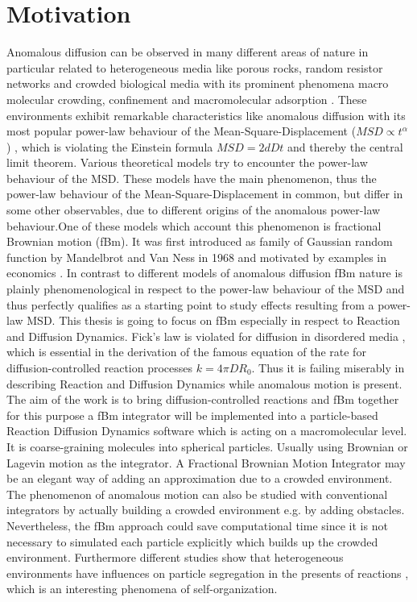 \documentclass[
  a4paper,BCOR10mm,oneside,
  bibtotoc,idxtotoc,
  headsepline,footsepline,%
  fleqn,openbib
]{scrbook}
\begin{document}
\chapter{Motivation}
Anomalous diffusion can be observed in many different areas of nature in particular related to heterogeneous media like porous rocks, random resistor networks and crowded biological media with its prominent phenomena macro molecular crowding, confinement and macromolecular adsorption \cite{Minton2006}. These environments exhibit remarkable characteristics like anomalous diffusion with its most popular power-law behaviour of the Mean-Square-Displacement ($MSD\propto t^{\alpha}$) \cite{Hofling2013}, which is violating the Einstein formula $MSD=2 d D t$ and thereby the central limit theorem. Various theoretical models try to encounter the power-law behaviour of the MSD. These models have the main phenomenon, thus the power-law behaviour of the Mean-Square-Displacement in common, but differ in some other observables, due to different origins of the anomalous power-law behaviour.One of these models which account this phenomenon is fractional Brownian motion (fBm). It was first introduced as family of Gaussian random function by Mandelbrot and Van Ness in 1968 and motivated by examples in economics \cite{Mandelbrot1968}. In contrast to different models of anomalous diffusion fBm nature is plainly phenomenological in respect to the power-law behaviour of the MSD and thus perfectly qualifies as a starting point to study effects resulting from a power-law  MSD. \newline 
This thesis is going to focus on fBm especially in respect to Reaction and Diffusion Dynamics.  Fick’s law is violated for diffusion in disordered media \cite{Havlin1987}, which is essential in the derivation of the famous equation of the rate for diffusion-controlled reaction processes $k=4 \pi D R_0$. Thus it is failing miserably in describing Reaction and Diffusion Dynamics while anomalous motion is present. The aim of the work is to bring diffusion-controlled reactions and fBm together for this purpose a fBm integrator will be implemented into a particle-based Reaction  Diffusion Dynamics software which is acting on a macromolecular level. It is coarse-graining molecules into spherical particles. Usually using Brownian or Lagevin motion as the integrator. A Fractional Brownian Motion Integrator may be an elegant way of adding an approximation due to a crowded environment. The phenomenon of anomalous motion can also be studied with conventional integrators by actually building a crowded environment e.g. by adding obstacles. Nevertheless, the fBm approach could save computational time since it is not necessary to simulated each particle  explicitly which builds up the crowded environment. Furthermore different studies show that heterogeneous environments have influences on particle segregation in the presents of reactions \cite{Berry2002}, which is an interesting phenomena of self-organization.\newline
\end{document}
